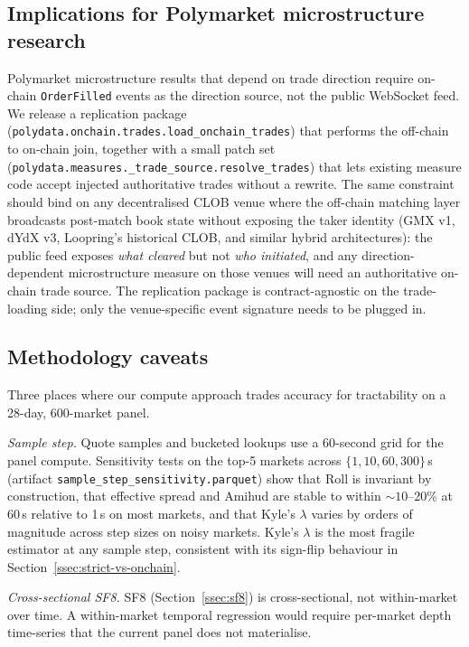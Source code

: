 \documentclass[11pt,a4paper,twocolumn]{article}
\begin{document}
\subsection{Implications for Polymarket microstructure research}\label{ssec:methodology}

Polymarket microstructure results that depend on trade direction
require on-chain \texttt{OrderFilled} events as the direction source,
not the public WebSocket feed. We release a replication package
(\texttt{polydata.\allowbreak onchain.\allowbreak trades.\allowbreak load\_onchain\_trades})
that performs the off-chain to on-chain join, together with a small
patch set
(\texttt{polydata.\allowbreak measures.\allowbreak \_trade\_source.\allowbreak resolve\_trades})
that lets existing measure code accept injected authoritative trades
without a rewrite. The same constraint should bind on any
decentralised CLOB venue where the off-chain matching layer
broadcasts post-match book state without exposing the taker
identity (GMX v1, dYdX v3, Loopring's historical CLOB, and similar
hybrid architectures): the public feed exposes \emph{what cleared}
but not \emph{who initiated}, and any direction-dependent
microstructure measure on those venues will need an authoritative
on-chain trade source. The replication package is contract-agnostic
on the trade-loading side; only the venue-specific event signature
needs to be plugged in.

\subsection{Methodology caveats}\label{ssec:methodology-caveats}

Three places where our compute approach trades accuracy for
tractability on a 28-day, 600-market panel.

\textit{Sample step.}
Quote samples and bucketed lookups use a 60-second grid for the panel
compute. Sensitivity tests on the top-5 markets across
$\{1, 10, 60, 300\}$\,s (artifact
\texttt{sample\_step\_sensitivity.parquet}) show that Roll is
invariant by construction, that effective spread and Amihud are
stable to within $\sim 10$--20\% at 60\,s relative to 1\,s on most
markets, and that Kyle's $\lambda$ varies by orders of magnitude
across step sizes on noisy markets. Kyle's $\lambda$ is the most
fragile estimator at any sample step, consistent with its
sign-flip behaviour in Section~\ref{ssec:strict-vs-onchain}.

\textit{Cross-sectional SF8.}
SF8 (Section~\ref{ssec:sf8}) is cross-sectional, not within-market
over time. A within-market temporal regression would require
per-market depth time-series that the current panel does not
materialise.
\end{document}
